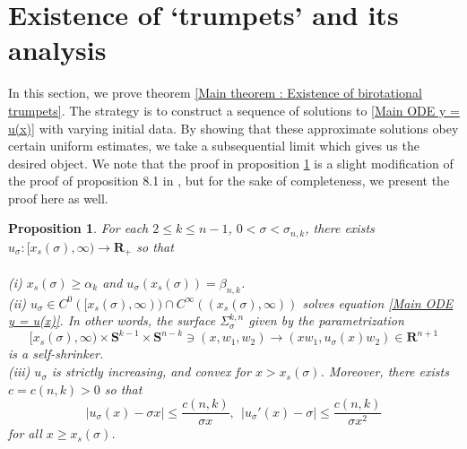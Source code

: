 \documentclass[pdflatex,sn-mathphys-num]{sn-jnl}
\newtheorem{proposition}[theorem]{Proposition}
\begin{document}
\section{Existence of `trumpets' and its analysis}\label{section 3}
In this section, we prove theorem \ref{Main theorem : Existence of birotational trumpets}. The strategy is to construct a sequence of solutions to \eqref{Main ODE y = u(x)} with varying initial data. By showing that these approximate solutions obey certain uniform estimates, we take a subsequential limit which gives us the desired object. We note that the proof in proposition \ref{Existence of trumpets} is a slight modification of the proof of proposition 8.1 in \cite{Park}, but for the sake of completeness, we present the proof here as well.
\begin{proposition}\label{Existence of trumpets}
For each $2 \leq k \leq n-1$, $0 < \sigma < \sigma_{n,k}$, there exists $u_{\sigma} : [x_{s}(\sigma) , \infty) \to \mathbf{R}_+$ so that\\\\
(i) $x_{s}(\sigma) \geq \alpha_k$ and $u_{\sigma}(x_{s}(\sigma)) = \beta_{n,k}$.\\
(ii) $u_{\sigma} \in C^0([x_{s}(\sigma), \infty)) \cap C^{\infty}((x_{s}(\sigma), \infty))$  solves equation \eqref{Main ODE y = u(x)}. In other words, the surface $\Sigma^{k,n}_{\sigma}$ given by the parametrization
\begin{equation}
    [x_s(\sigma) , \infty) \times \mathbf{S}^{k-1}\times \mathbf{S}^{n-k} \ni (x, w_1, w_2) \to (xw_1, u_{\sigma}(x)w_2) \in  \mathbf{R}^{n+1}
\end{equation}
is a self-shrinker. \\
(iii) $u_{\sigma}$ is strictly increasing, and convex for $x > x_{s}(\sigma)$. Moreover, there exists $c = c(n,k) > 0$ so that
\begin{equation}\label{asymptotics of trumpets}
    |u_{\sigma}(x) - \sigma x| \leq \frac{c(n,k)}{\sigma x}, \ \ |u_{\sigma}'(x) - \sigma| \leq \frac{c(n,k)}{\sigma x^2}
\end{equation}
for all $x \geq x_{s}(\sigma)$. 
\end{proposition}
\end{document}
